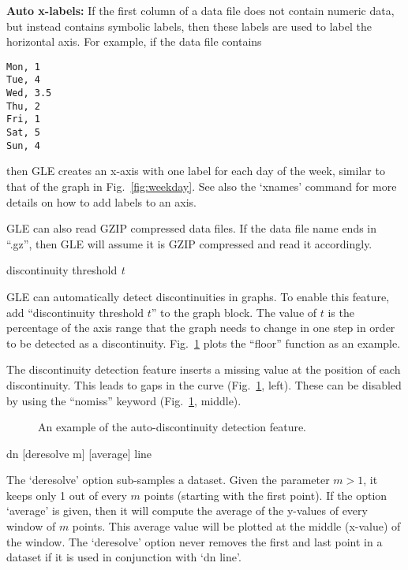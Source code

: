 \begin{commanddescription}
{\bf Auto x-labels:} If the first column of a data file does not contain numeric data, but instead contains symbolic labels, then these labels are used to label the horizontal axis. For example, if the data file contains

\begin{Verbatim}
Mon, 1
Tue, 4
Wed, 3.5
Thu, 2
Fri, 1
Sat, 5
Sun, 4
\end{Verbatim}

\noindent{}then GLE creates an x-axis with one label for each day of the week, similar to that of the graph in Fig.~\ref{fig:weekday}. See also the `{\sf xnames}' command for more details on how to add labels to an axis.

GLE can also read GZIP compressed data files. If the data file name ends in ``.gz'', then GLE will assume it is GZIP compressed and read it accordingly.

\item[{\sf discontinuity threshold {\it t}}]

GLE can automatically detect discontinuities in graphs. To enable this feature, add ``{\sf discontinuity threshold $t$}'' to the graph block. The value of $t$ is the percentage of the axis range that the graph needs to change in one step in order to be detected as a discontinuity. Fig.~\ref{fig:discont} plots the ``floor'' function as an example.

The discontinuity detection feature inserts a missing value at the position of each discontinuity. This leads to gaps in the curve (Fig.~\ref{fig:discont}, left). These can be disabled by using the ``nomiss'' keyword (Fig.~\ref{fig:discont}, middle).

\begin{figure}
\centering
\mbox{}
\caption{\label{fig:discont}An example of the auto-discontinuity detection feature.}
\end{figure}

\item[{\sf dn [deresolve m] [average] line}]

The `{\sf deresolve}' option sub-samples a dataset. Given the parameter $m > 1$, it keeps only 1 out of every $m$ points (starting with the first point). If the option `{\sf average}' is given, then it will compute the average of the y-values of every window of $m$ points. This average value will be plotted at the middle (x-value) of the window. The `{\sf deresolve}' option never removes the first and last point in a dataset if it is used in conjunction with `{\sf dn line}'.


\end{commanddescription}
